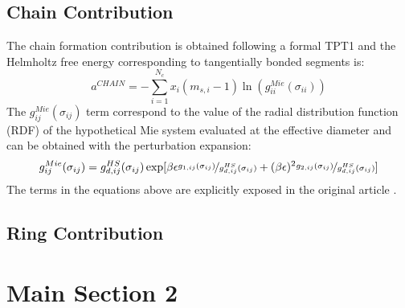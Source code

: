 \subsection{Chain Contribution}
The chain formation contribution is obtained following a formal TPT1 \cite{papa2014} and the Helmholtz free energy corresponding to tangentially bonded segments is:
\begin{equation}
a^{CHAIN} =-\sum_{i=1}^{N_{c}} x_{i}(m_{s,i} - 1)\ln(g_{ii}^{Mie}(\sigma_{ii}))
\label{eqn:achain}
\end{equation}
The $g_{ij}^{Mie}(\sigma_{ij})$ term correspond to the value of the radial distribution function (RDF) of the hypothetical Mie system evaluated at the effective diameter and can be obtained with the perturbation expansion:
\begin{equation}
g_{ij}^{Mie}(\sigma_{ij}) =g_{d,ij}^{HS}(\sigma_{ij})\exp[\beta\epsilon \nicefrac{g_{1,ij}(\sigma_{ij})}{g_{d,ij}^{HS}(\sigma_{ij})} + (\beta\epsilon)^2 \nicefrac{g_{2,ij}(\sigma_{ij})}{g_{d,ij}^{HS}(\sigma_{ij})}]
\label{eqn:achain}
\end{equation}
The terms in the equations above are explicitly exposed in the original article \cite{lafitte2013}. 
\subsection{Ring Contribution}


\section{Main Section 2}

